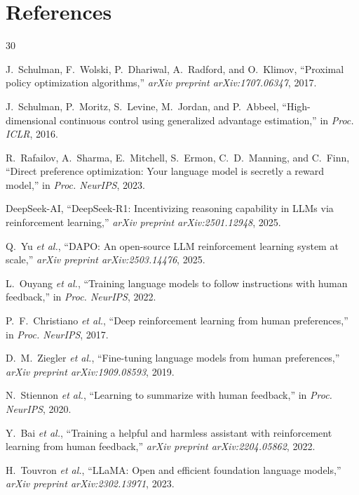 \documentclass[10pt,twocolumn]{article}
\begin{document}
\section*{References}
\begin{thebibliography}{30}

J.~Schulman, F.~Wolski, P.~Dhariwal, A.~Radford, and O.~Klimov, ``Proximal policy optimization algorithms,'' \textit{arXiv preprint arXiv:1707.06347}, 2017.

J.~Schulman, P.~Moritz, S.~Levine, M.~Jordan, and P.~Abbeel, ``High-dimensional continuous control using generalized advantage estimation,'' in \textit{Proc. ICLR}, 2016.

R.~Rafailov, A.~Sharma, E.~Mitchell, S.~Ermon, C.~D.~Manning, and C.~Finn, ``Direct preference optimization: Your language model is secretly a reward model,'' in \textit{Proc. NeurIPS}, 2023.

DeepSeek-AI, ``DeepSeek-R1: Incentivizing reasoning capability in LLMs via reinforcement learning,'' \textit{arXiv preprint arXiv:2501.12948}, 2025.

Q.~Yu \textit{et al.}, ``DAPO: An open-source LLM reinforcement learning system at scale,'' \textit{arXiv preprint arXiv:2503.14476}, 2025.

L.~Ouyang \textit{et al.}, ``Training language models to follow instructions with human feedback,'' in \textit{Proc. NeurIPS}, 2022.

P.~F.~Christiano \textit{et al.}, ``Deep reinforcement learning from human preferences,'' in \textit{Proc. NeurIPS}, 2017.

D.~M.~Ziegler \textit{et al.}, ``Fine-tuning language models from human preferences,'' \textit{arXiv preprint arXiv:1909.08593}, 2019.

N.~Stiennon \textit{et al.}, ``Learning to summarize with human feedback,'' in \textit{Proc. NeurIPS}, 2020.

Y.~Bai \textit{et al.}, ``Training a helpful and harmless assistant with reinforcement learning from human feedback,'' \textit{arXiv preprint arXiv:2204.05862}, 2022.

H.~Touvron \textit{et al.}, ``LLaMA: Open and efficient foundation language models,'' \textit{arXiv preprint arXiv:2302.13971}, 2023.


\end{thebibliography}
\end{document}
